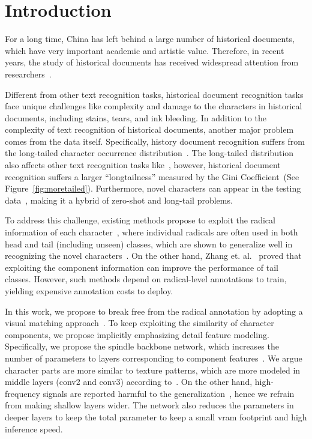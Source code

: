 \section{Introduction}

For a long time, China has left behind a large number of historical documents, which have very important academic and artistic value. 
Therefore, in recent years, the study of historical documents has received widespread attention from researchers~\cite{jinic21,hde,obc306}. 

Different from other text recognition tasks, historical document recognition tasks face unique challenges like complexity and damage to the characters in historical documents, including stains, tears, and ink bleeding. 
In addition to the complexity of text recognition of historical documents, another major problem comes from the data itself. Specifically, history document recognition suffers from the long-tailed character occurrence distribution~\cite{obc306mk2}. 
The long-tailed distribution also affects other text recognition tasks like~\cite{fudanvi}, however, historical document recognition suffers a larger ``longtailness'' measured by the Gini Coefficient~\cite{tailsurvey}(See Figure~\ref{fig:moretailed}). 
Furthermore, novel characters can appear in the testing data~\cite{jinic21}, making it a hybrid of zero-shot and long-tail problems.



To address this challenge, existing methods propose to exploit the radical information of each character~\cite{denseran}, where individual radicals are often used in both head and tail (including unseen) classes, which are shown to generalize well in recognizing the novel characters~\cite{fewran,zhang20pr}.
On the other hand, Zhang et. al.~\cite{sanicdar23}  proved that exploiting the component information can improve the performance of tail classes.
However, such methods depend on radical-level annotations to train, yielding expensive annotation costs to deploy.

In this work, we propose to break free from the radical annotation by adopting a visual matching approach~\cite{vsdf}. 
To keep exploiting the similarity of character components, we propose implicitly emphasizing detail feature modeling.  
Specifically, we propose the spindle backbone network, which increases the number of parameters to layers corresponding to component features~\cite{mobile}. 
We argue character parts are more similar to texture patterns, which are more modeled in middle layers (conv2 and conv3) according to~\cite{dissection}.
On the other hand, high-frequency signals are reported harmful to the generalization~\cite{hfharm,hffilter}, hence we refrain from making shallow layers wider. 
The network also reduces the parameters in deeper layers to keep the total parameter to keep a small vram footprint and high inference speed.

